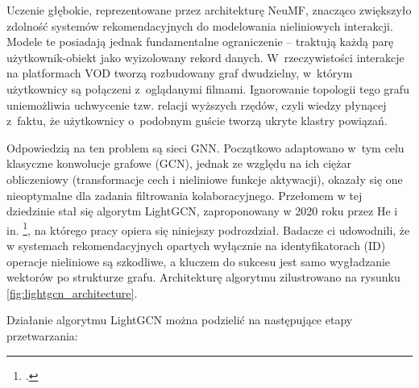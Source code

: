 Uczenie głębokie, reprezentowane przez architekturę NeuMF, znacząco zwiększyło zdolność systemów rekomendacyjnych do modelowania nieliniowych interakcji. Modele te posiadają jednak fundamentalne ograniczenie -- traktują każdą parę użytkownik-obiekt jako wyizolowany rekord danych. W~rzeczywistości interakcje na platformach VOD tworzą rozbudowany graf dwudzielny, w~którym użytkownicy są połączeni z~oglądanymi filmami. Ignorowanie topologii tego grafu uniemożliwia uchwycenie tzw. relacji wyższych rzędów, czyli wiedzy płynącej z~faktu, że użytkownicy o~podobnym guście tworzą ukryte klastry powiązań.

Odpowiedzią na ten problem są sieci GNN. Początkowo adaptowano w~tym celu klasyczne konwolucje grafowe (GCN), jednak ze względu na ich ciężar obliczeniowy (transformacje cech i nieliniowe funkcje aktywacji), okazały się one nieoptymalne dla zadania filtrowania kolaboracyjnego. Przełomem w tej dziedzinie stał się algorytm LightGCN, zaproponowany w 2020 roku przez He i in. \footcite{heLightGCNSimplifyingPowering2020}, na którego pracy opiera się niniejszy podrozdział. Badacze ci udowodnili, że w systemach rekomendacyjnych opartych wyłącznie na identyfikatorach (ID) operacje nieliniowe są szkodliwe, a kluczem do sukcesu jest samo wygładzanie wektorów po strukturze grafu. Architekturę algorytmu zilustrowano na rysunku \ref{fig:lightgcn_architecture}.

Działanie algorytmu LightGCN można podzielić na następujące etapy przetwarzania:

